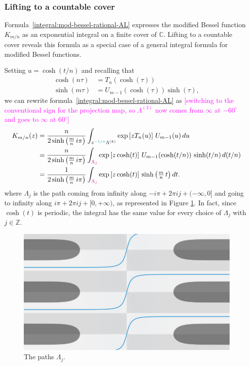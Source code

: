 \documentclass{article}
\theoremstyle{definition}
\newcommand{\Z}{\mathbb{Z}}
\newcommand{\C}{\mathbb{C}}
\theoremstyle{plain}
\begin{document}
\subsubsection{Lifting to a countable cover}\label{countable-cover}
Formula~\eqref{integral:mod-bessel-rational-AL} expresses the modified Bessel function $K_{m/n}$ as an exponential integral on a finite cover of $\C$. Lifting to a countable cover reveals this formula as a special case of a general integral formula for modified Bessel functions.

Setting $u = \cosh(t/n)$ and recalling that
\begin{align*}
\cosh(n\tau) & = T_n(\cosh(\tau)) \\
\sinh(m\tau) & = U_{m-1}(\cosh(\tau)) \sinh(\tau),
\end{align*}
we can rewrite formula~\eqref{integral:mod-bessel-rational-AL} as \textcolor{magenta}{[switching to the conventional sign for the projection map, so $\Lambda^{(3)}$ now comes from $\infty$ at $-60^\circ$ and goes to $\infty$ at $60^\circ$]}
\begin{align}
\notag K_{m/n}(z) & = \frac{n}{2 \sinh\big(\tfrac{m}{n}\,i\pi\big)} \int_{z^{-\textcolor{DarkCyan}{1/n}}\Lambda^{(k)}} \exp\left[z T_n(u)\right]\,U_{m-1}(u)\,du \\
\notag & = \frac{n}{2 \sinh\big(\tfrac{m}{n}\,i\pi\big)} \int_{\textcolor{magenta}{\Lambda_j}} \exp\left[z \cosh(t)\right]\,U_{m-1}(\cosh(t/n))\,\sinh(t/n)\,d(t/n) \\
\label{integral:mod-bessel-lifted} & = \frac{1}{2 \sinh\big(\tfrac{m}{n}\,i\pi\big)} \int_{\textcolor{magenta}{\Lambda_j}} \exp\left[z \cosh(t)\right]\,\sinh\big(\tfrac{m}{n}\,t\big)\,dt.
\end{align}
where $\Lambda_j$ is the path coming from infinity along $-i\pi+2\pi i j+(-\infty,0]$ and going to infinity along $i \pi+2\pi i j+[0,+\infty)$, as represented in Figure \ref{fig:bessel_unrolled}. In fact, since $\cosh(t)$ is periodic, the integral has the same value for every choice of $\Lambda_j$ with $j\in\Z$.  
\begin{figure}[ht]
    \centering
    \includegraphics[scale=0.3]{figures/Bessel0_unrolled_lightblue.png}
    \caption{The paths $\Lambda_j$.}
    \label{fig:bessel_unrolled}
\end{figure}
\end{document}
